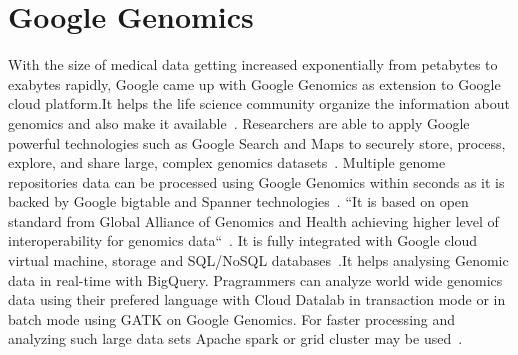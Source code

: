 \section{Google Genomics}

With the size of medical data getting increased exponentially from 
petabytes to exabytes rapidly, Google came up with Google Genomics 
as extension to Google cloud platform.It helps the life science 
community organize the information about genomics and also make it 
available~\cite{hid-sp18-523-www-genomics}. 
Researchers are able to apply Google powerful technologies such as 
Google Search and Maps to securely store, process, explore, and share 
large, complex genomics datasets~\cite{hid-sp18-523-www-genomics}.
Multiple genome repositories data can be processed using Google 
Genomics within seconds as it is backed by Google bigtable and 
Spanner technologies~\cite{hid-sp18-523-www-genomics}. 
``It is based on open standard from Global Alliance of Genomics and 
Health achieving higher level of interoperability for genomics 
data``~\cite{hid-sp18-523-www-genomics}. It is fully integrated with 
Google cloud virtual machine, storage and SQL/NoSQL 
databases~\cite{hid-sp18-523-www-genomics}.It helps analysing Genomic 
data in real-time with BigQuery. Pragrammers can analyze world
wide genomics data using their prefered language with Cloud Datalab in 
transaction mode or in batch mode using GATK on Google Genomics. For faster
processing and analyzing such large data sets Apache spark or grid cluster
may be used~\cite{hid-sp18-523-www-genomics}.
